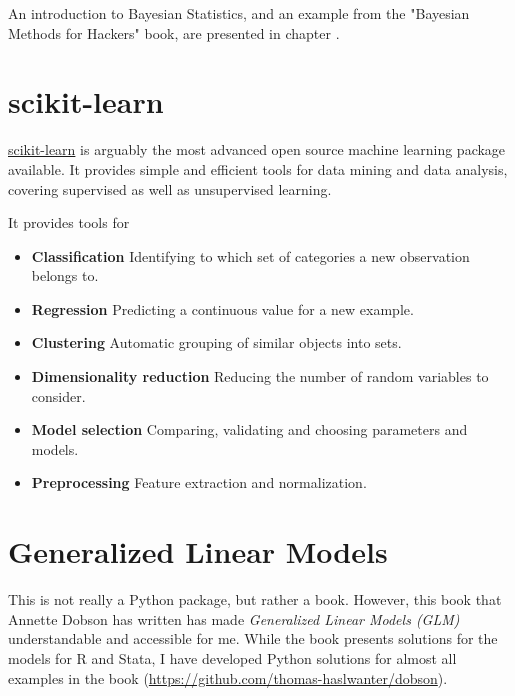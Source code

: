 An introduction to Bayesian Statistics, and an example from the "Bayesian Methods for Hackers" book, are presented in chapter .

\section{scikit-learn}

\href{scikit-learn.org}{scikit-learn} is arguably the most advanced open source machine learning package available. It provides simple and efficient tools for data mining and data analysis, covering supervised as well as unsupervised learning.

It provides tools for

\begin{itemize}
  \item \textbf{Classification}    Identifying to which set of categories a new observation belongs to.
  \item \textbf{Regression}    Predicting a continuous value for a new example.
  \item \textbf{Clustering}    Automatic grouping of similar objects into sets.
  \item \textbf{Dimensionality reduction}    Reducing the number of random variables to consider.
  \item \textbf{Model selection}    Comparing, validating and choosing parameters and models.
  \item \textbf{Preprocessing}    Feature extraction and normalization.
\end{itemize}

\section{Generalized Linear Models}

This is not really a Python package, but rather a book. However, this book that Annette Dobson has written has made \emph{Generalized Linear Models (GLM)} \cite{Dobson2008} understandable and accessible for me. While the book presents solutions for the models for R and Stata, I have developed Python solutions for almost all examples in the book (\url{https://github.com/thomas-haslwanter/dobson}). 